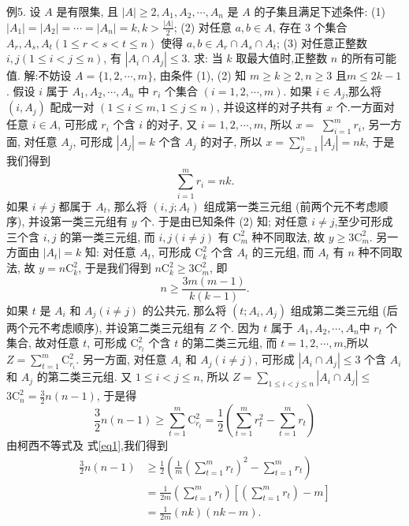 例5. 设 $A$ 是有限集, 且 $|A| \geqslant 2, A_1, A_2, \cdots, A_n$ 是 $A$ 的子集且满足下述条件:
(1) $\left|A_1\right|=\left|A_2\right|=\cdots=\left|A_n\right|=k, k>\frac{|A|}{2}$;
(2) 对任意 $a, b \in A$, 存在 3 个集合 $A_r, A_s, A_t(1 \leqslant r<s<t \leqslant n)$ 使得 $a, b \in A_r \cap A_s \cap A_t$;
(3) 对任意正整数 $i, j(1 \leqslant i<j \leqslant n)$, 有 $\left|A_i \cap A_j\right| \leqslant 3$.
求: 当 $k$ 取最大值时,正整数 $n$ 的所有可能值.
解:不妨设 $A=\{1,2, \cdots, m\}$, 由条件 (1), (2) 知 $m \geqslant k \geqslant 2, n \geqslant 3$ 且$m \leqslant 2 k-1$.
假设 $i$ 属于 $A_1, A_2, \cdots, A_n$ 中 $r_i$ 个集合 $(i=1,2, \cdots, m)$. 如果 $i \in A_j$,那么将 $\left(i, A_j\right)$ 配成一对 $(1 \leqslant i \leqslant m, 1 \leqslant j \leqslant n)$, 并设这样的对子共有 $x$ 个.一方面对任意 $i \in A$, 可形成 $r_i$ 个含 $i$ 的对子, 又 $i=1,2, \cdots, m$, 所以 $x=$ $\sum_{i=1}^m r_i$, 另一方面, 对任意 $A_j$, 可形成 $\left|A_j\right|=k$ 个含 $A_j$ 的对子, 所以 $x=\sum_{j=1}^n\left|A_j\right|=n k$, 于是我们得到
$$
\sum_{i=1}^m r_i=n k . \label{eq1}
$$
如果 $i \neq j$ 都属于 $A_t$, 那么将 $\left(i, j ; A_t\right)$ 组成第一类三元组 (前两个元不考虑顺序), 并设第一类三元组有 $y$ 个. 于是由已知条件 (2) 知; 对任意 $i \neq j$,至少可形成三个含 $i, j$ 的第一类三元组, 而 $i, j(i \neq j)$ 有 $\mathrm{C}_m^2$ 种不同取法, 故 $y \geqslant 3 \mathrm{C}_m^2$. 另一方面由 $\left|A_t\right|=k$ 知: 对任意 $A_t$, 可形成 $\mathrm{C}_k^2$ 个含 $A_t$ 的三元组, 而 $A_t$ 有 $n$ 种不同取法, 故 $y=n \mathrm{C}_k^2$, 于是我们得到 $n \mathrm{C}_k^2 \geqslant 3 \mathrm{C}_m^2$, 即
$$
n \geqslant \frac{3 m(m-1)}{k(k-1)} . \label{eq2}
$$
如果 $t$ 是 $A_i$ 和 $A_j(i \neq j)$ 的公共元, 那么将 $\left(t ; A_i, A_j\right)$ 组成第二类三元组 (后两个元不考虑顺序), 并设第二类三元组有 $Z$ 个. 因为 $t$ 属于 $A_1, A_2, \cdots, A_n$中 $r_t$ 个集合, 故对任意 $t$, 可形成 $\mathrm{C}_{r_t}^2$ 个含 $t$ 的第二类三元组, 而 $t=1,2, \cdots, m$,所以 $Z=\sum_{t=1}^m \mathrm{C}_{r_i}^2$. 另一方面, 对任意 $A_i$ 和 $A_j(i \neq j)$, 可形成 $\left|A_i \cap A_j\right| \leqslant 3$ 个含 $A_i$ 和 $A_j$ 的第二类三元组. 又 $1 \leqslant i<j \leqslant n$, 所以 $Z=\sum_{1 \leqslant i<j \leqslant n}\left|A_i \cap A_j\right| \leqslant$ $3 \mathrm{C}_n^2=\frac{3}{2} n(n-1)$, 于是得
$$
\frac{3}{2} n(n-1) \geqslant \sum_{t=1}^m \mathrm{C}_{r_t}^2=\frac{1}{2}\left(\sum_{t=1}^m r_t^2-\sum_{t=1}^m r_t\right)
$$
由柯西不等式及 式\ref{eq1},我们得到
$$
\begin{aligned}
\frac{3}{2} n(n-1) & \geqslant \frac{1}{2}\left(\frac{1}{m}\left(\sum_{t=1}^m r_t\right)^2-\sum_{t=1}^m r_t\right) \\
& =\frac{1}{2 m}\left(\sum_{t=1}^m r_t\right)\left[\left(\sum_{t=1}^m r_t\right)-m\right] \\
& =\frac{1}{2 m}(n k)(n k-m) .
\end{aligned}
$$
